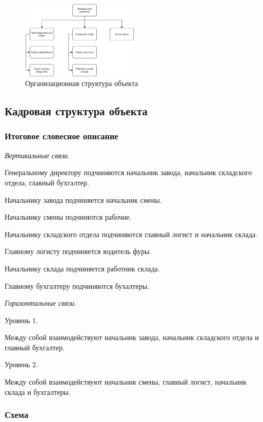 \begin{figure}[h!]
        \centering
        \includegraphics[width=0.5\textwidth]{images/3/hierarchy.eps}
        \caption{Организационная структура объекта}
\end{figure}

\subsection{Кадровая структура объекта}

\subsubsection{Итоговое словесное описание}

\emph{Вертикальные связи.}

Генеральному директору подчиняются начальник завода, начальник складского отдела, главный бухгалтер.

Начальнику завода подчиняется начальник смены.

Начальнику смены подчинются рабочие.

Начальнику складского отдела подчиняются главный логист и начальник склада.

Главному логисту подчиняется водитель фуры.

Начальнику склада подчиняется работник склада.

Главному бухгалтеру подчиняются бухалтеры.

\emph{Горизонтальные связи.}

Уровень 1.

Между собой взаимодействуют начальник завода, начальник складского отдела и главный бухгалтер.

Уровень 2.

Между собой взаимодействуют начальник смены, главный логист, начальник склада и бухгалтеры.

\subsubsection{Схема}

